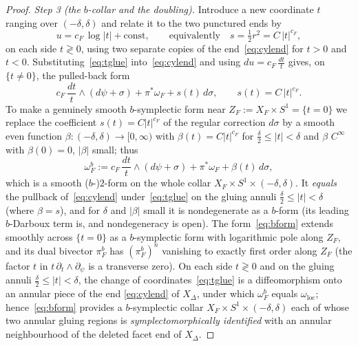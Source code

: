 \documentclass{amsart}
\theoremstyle{definition}
\begin{document}
\begin{proof}
\emph{Step 3 (the $b$-collar and the doubling).} Introduce a new coordinate $t$
ranging over $(-\delta,\delta)$ and relate it to the two punctured ends by
\begin{equation}\label{eq:tglue}
u=c_F\,\log|t|+\text{const},\qquad\text{equivalently}\quad
s=\tfrac12 r^2=C\,|t|^{c_F},
\end{equation}
on each side $t\gtrless0$, using two separate copies of the end~\eqref{eq:cylend}
for $t>0$ and $t<0$. Substituting~\eqref{eq:tglue} into~\eqref{eq:cylend} and
using $du=c_F\,\tfrac{dt}{t}$ gives, on $\{t\neq0\}$, the pulled-back form
\[
c_F\,\frac{dt}{t}\wedge(d\psi+\sigma)+\pi^*\omega_F+s(t)\,d\sigma,\qquad
s(t)=C\,|t|^{c_F}.
\]
To make a genuinely smooth $b$-symplectic form near $Z_F:=X_F\times S^1=
\{t=0\}$ we replace the coefficient $s(t)=C|t|^{c_F}$ of the regular correction
$d\sigma$ by a smooth even function $\beta\colon(-\delta,\delta)\to[0,\infty)$
with $\beta(t)=C|t|^{c_F}$ for $\tfrac{\delta}2\le|t|<\delta$ and $\beta$
$C^\infty$ with $\beta(0)=0$, $|\beta|$ small; thus
\begin{equation}\label{eq:bform}
\omega^b_F:=c_F\,\frac{dt}{t}\wedge(d\psi+\sigma)+\pi^*\omega_F+\beta(t)\,d\sigma,
\end{equation}
which is a smooth ($b$-)$2$-form on the whole collar $X_F\times S^1\times(-\delta,
\delta)$. It \emph{equals} the pullback of~\eqref{eq:cylend} under~\eqref{eq:tglue}
on the gluing annuli $\tfrac\delta2\le|t|<\delta$ (where $\beta=s$), and for
$\delta$ and $|\beta|$ small it is nondegenerate as a $b$-form (its leading
$b$-Darboux term is, and nondegeneracy is open). The form~\eqref{eq:bform}
extends smoothly across $\{t=0\}$ as a $b$-symplectic form with logarithmic pole
along $Z_F$, and its dual bivector $\pi^b_F$
has $(\pi^b_F)^n$ vanishing to exactly first order along $Z_F$ (the factor $t$
in $t\,\partial_t\wedge\partial_\psi$ is a transverse zero). On each side
$t\gtrless0$ and on the gluing annuli $\tfrac\delta2\le|t|<\delta$, the change of
coordinates~\eqref{eq:tglue} is a diffeomorphism onto an annular piece of the end
\eqref{eq:cylend} of $X_\Delta$, under which $\omega^b_F$ equals
$\omega_{\mathrm{loc}}$; hence~\eqref{eq:bform} provides a $b$-symplectic collar
$X_F\times S^1\times(-\delta,\delta)$ each of whose two annular gluing regions is
\emph{symplectomorphically identified} with an annular neighbourhood of the
deleted facet end of $X_\Delta$.


\end{proof}
\end{document}
